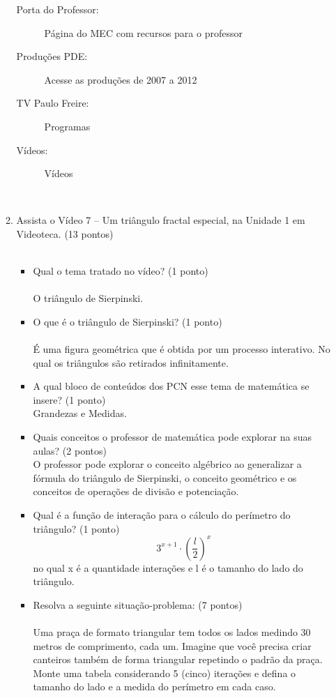 \documentclass[a4paper, 12pt]{article}
\begin{document}
\begin{enumerate}
\begin{enumerate}
\begin{description}
      \item[Porta do Professor:] Página do MEC com recursos para o professor
      \item[Produções PDE:] Acesse as produções de 2007 a 2012
      \item[TV Paulo Freire:] Programas
      \item[Vídeos:] Vídeos
      \end{description} \\
    \item Assista o Vídeo 7 – Um triângulo fractal especial, na Unidade 1 em Videoteca. (13 pontos) \\ \\
      \begin{itemize}
      \item Qual o tema tratado no vídeo? (1 ponto) \\ \\
        O triângulo de Sierpinski. \\
      \item O que é o triângulo de Sierpinski? (1 ponto) \\ \\
        É uma figura geométrica que é obtida por um processo interativo. No qual os triângulos são retirados infinitamente. \\
      \item A qual bloco de conteúdos dos PCN esse tema de matemática se insere? (1 ponto) \\
        Grandezas e Medidas.
      \item Quais conceitos o professor de matemática pode explorar na suas aulas? (2 pontos) \\
        O professor pode explorar o conceito algébrico ao generalizar a fórmula do triângulo de Sierpinski, o conceito geométrico e os conceitos de operações de divisão e potenciação. \\
      \item Qual é a função de interação para o cálculo do perímetro do triângulo? (1 ponto)
        $$3^{x+1}\cdot\left(\frac{l}{2}\right)^{x}$$ no qual x é a quantidade interações e l é o tamanho do lado do triângulo.
      \item Resolva a seguinte situação-problema: (7 pontos) \\ \\
        Uma praça de formato triangular tem todos os lados medindo 30 metros de comprimento, cada um. Imagine que você precisa criar canteiros também de forma triangular repetindo o padrão da praça. Monte uma tabela considerando 5 (cinco) iterações e defina o tamanho do lado e a medida do perímetro em cada caso. \\ \\

\end{itemize}
\end{enumerate}
\end{enumerate}
\end{document}
